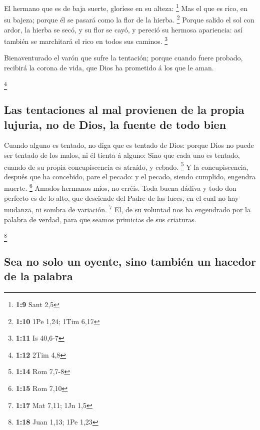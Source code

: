  El hermano que es de baja suerte, gloríese en su alteza:
\footnote{\textbf{1:9} Sant 2,5}  Mas el que es rico, en
su bajeza; porque él se pasará como la flor de la hierba. \footnote{\textbf{1:10}
  1Pe 1,24; 1Tim 6,17}  Porque salido el sol con ardor,
la hierba se secó, y su flor se cayó, y pereció su hermosa apariencia:
así también se marchitará el rico en todos sus caminos. \footnote{\textbf{1:11}
  Is 40,6-7}

 Bienaventurado el varón que sufre la tentación; porque
cuando fuere probado, recibirá la corona de vida, que Dios ha prometido
á los que le aman.

\footnote{\textbf{1:12} 2Tim 4,8}

\hypertarget{las-tentaciones-al-mal-provienen-de-la-propia-lujuria-no-de-dios-la-fuente-de-todo-bien}{%
\subsection{Las tentaciones al mal provienen de la propia lujuria, no de
Dios, la fuente de todo
bien}\label{las-tentaciones-al-mal-provienen-de-la-propia-lujuria-no-de-dios-la-fuente-de-todo-bien}}

 Cuando alguno es tentado, no diga que es tentado de
Dios: porque Dios no puede ser tentado de los malos, ni él tienta á
alguno:  Sino que cada uno es tentado, cuando de su
propia concupiscencia es atraído, y cebado. \footnote{\textbf{1:14} Rom
  7,7-8}  Y la concupiscencia, después que ha concebido,
pare el pecado: y el pecado, siendo cumplido, engendra muerte.
\footnote{\textbf{1:15} Rom 7,10}  Amados hermanos míos,
no erréis.  Toda buena dádiva y todo don perfecto es de
lo alto, que desciende del Padre de las luces, en el cual no hay
mudanza, ni sombra de variación. \footnote{\textbf{1:17} Mat 7,11; 1Jn
  1,5}  El, de su voluntad nos ha engendrado por la
palabra de verdad, para que seamos primicias de sus criaturas.

\footnote{\textbf{1:18} Juan 1,13; 1Pe 1,23}

\hypertarget{sea-no-solo-un-oyente-sino-tambiuxe9n-un-hacedor-de-la-palabra}{%
\subsection{Sea no solo un oyente, sino también un hacedor de la
palabra}\label{sea-no-solo-un-oyente-sino-tambiuxe9n-un-hacedor-de-la-palabra}}


